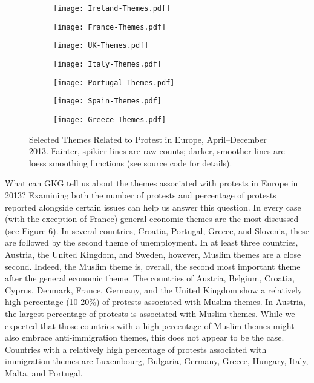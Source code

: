 \documentclass[10pt]{article}
\begin{document}
\begin{figure*}
\begin{center}
\begin{subfigure}[b]{0.45\textwidth}
\texttt{[image: Ireland-Themes.pdf]}
\end{subfigure}
\begin{subfigure}[b]{0.45\textwidth}
\texttt{[image: France-Themes.pdf]}
\end{subfigure}
\begin{subfigure}[b]{0.45\textwidth}
\texttt{[image: UK-Themes.pdf]}
\end{subfigure}
\begin{subfigure}[b]{0.45\textwidth}
\texttt{[image: Italy-Themes.pdf]}
\end{subfigure}
\begin{subfigure}[b]{0.45\textwidth}
\texttt{[image: Portugal-Themes.pdf]}
\end{subfigure}
\begin{subfigure}[b]{0.45\textwidth}
\texttt{[image: Spain-Themes.pdf]}
\end{subfigure}
\begin{subfigure}[b]{0.45\textwidth}
\end{subfigure}
\begin{subfigure}[b]{0.45\textwidth}
\texttt{[image: Greece-Themes.pdf]}
\end{subfigure}
\caption{Selected Themes Related to Protest in Europe, April--December 2013. Fainter, spikier lines are raw counts; darker, smoother lines are loess smoothing functions (see source code for details).}
\end{center}
\end{figure*}

What can GKG tell us about the themes associated with protests in Europe in 2013? Examining both the number of protests and percentage of protests reported alongside certain issues can help us answer this question. In every case (with the exception of France) general economic themes are the most discussed (see Figure 6).  In several countries, Croatia, Portugal, Greece, and Slovenia, these are followed by the second theme of unemployment.  In at least three countries, Austria, the United Kingdom, and Sweden, however, Muslim themes are a close second.  Indeed, the Muslim theme is, overall, the second most important theme after the general economic theme.  The countries of Austria, Belgium, Croatia, Cyprus, Denmark, France, Germany, and the United Kingdom show a relatively high percentage (10-20\%) of protests associated with Muslim themes.  In Austria, the largest percentage of protests is associated with Muslim themes.  While we expected that those countries with a high percentage of Muslim themes might also embrace anti-immigration themes, this does not appear to be the case.  Countries with a relatively high percentage of protests associated with immigration themes are Luxembourg, Bulgaria, Germany, Greece, Hungary, Italy, Malta, and Portugal.  
\end{document}
